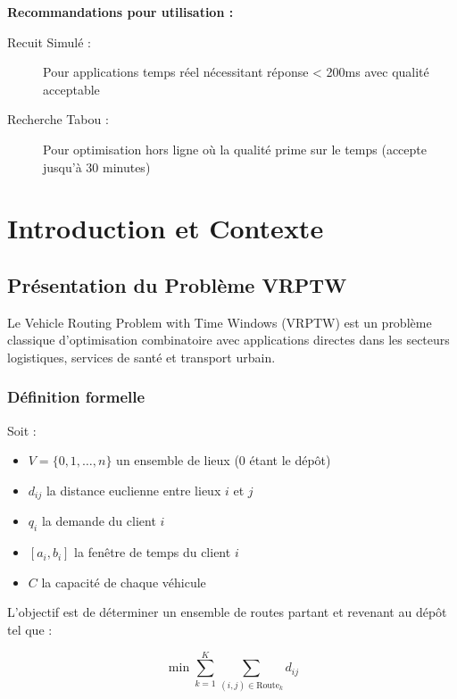 \documentclass[12pt,a4paper,twoside]{report}
\begin{document}
\vspace{0.5cm}

\noindent\textbf{Recommandations pour utilisation :}

\begin{description}
    \item[Recuit Simulé :] Pour applications temps réel nécessitant réponse < 200ms avec
          qualité acceptable
    \item[Recherche Tabou :] Pour optimisation hors ligne où la qualité prime sur le
          temps (accepte jusqu'à 30 minutes)
\end{description}

\tableofcontents
\newpage

\chapter{Introduction et Contexte}

\section{Présentation du Problème VRPTW}

Le Vehicle Routing Problem with Time Windows (VRPTW) est un problème classique
d'optimisation combinatoire avec applications directes dans les secteurs
logistiques, services de santé et transport urbain.

\subsection{Définition formelle}

Soit :
\begin{itemize}
    \item $V = \{0, 1, \ldots, n\}$ un ensemble de lieux (0 étant le dépôt)
    \item $d_{ij}$ la distance euclienne entre lieux $i$ et $j$
    \item $q_i$ la demande du client $i$
    \item $[a_i, b_i]$ la fenêtre de temps du client $i$
    \item $C$ la capacité de chaque véhicule
\end{itemize}

L'objectif est de déterminer un ensemble de routes partant et revenant au dépôt
tel que :

\begin{equation}
    \min \sum_{k=1}^{K} \sum_{(i,j) \in \text{Route}_k} d_{ij}
\end{equation}
\end{document}
